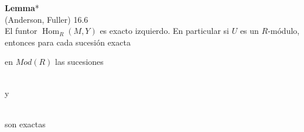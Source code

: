 \documentclass{article}
\begin{document}
\begin{enumerate}[label=\textbf{Ej \arabic*.}]
\textbf{Lemma}*\\
(Anderson, Fuller) 16.6\\
El funtor $\operatorname{Hom}_R(M,Y)$ es exacto izquierdo. En particular si $U$ es un $R$-módulo, entonces para cada sucesión exacta 
en $Mod(R)$ las sucesiones 
\\
y \,\,
\\
son exactas\\


\end{enumerate}
\end{document}
